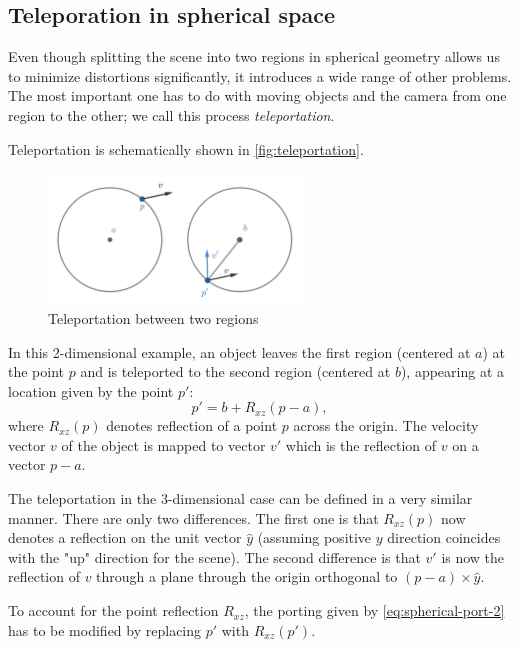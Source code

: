 \subsection{Teleporation in spherical space} \label{sub:teleportation}
Even though splitting the scene into two regions in spherical geometry allows us to minimize distortions significantly, it introduces a wide range of other problems.
The most important one has to do with moving objects and the camera from one region to the other; we call this process \textit{teleportation}.

Teleportation is schematically shown in \autoref{fig:teleportation}.
\begin{figure}[!htb]
    \centering
    \includegraphics[width=0.6\textwidth]{chapters/theoretical_foundations/sections/non-eudlidean-spaces/resources/teleportation.png}
    \caption{Teleportation between two regions}
    \label{fig:teleportation}
\end{figure}
In this 2-dimensional example, an object leaves the first region (centered at $a$) at the point $p$ and is teleported to the second region (centered at $b$), appearing at a location given by the point $p'$:
\begin{equation*}
    p' = b + R_{xz}(p - a),
\end{equation*}
where $R_{xz}(p)$ denotes reflection of a point $p$ across the origin.
The velocity vector $v$ of the object is mapped to vector $v'$ which is the reflection of $v$ on a vector $p - a$.

The teleportation in the 3-dimensional case can be defined in a very similar manner.
There are only two differences.
The first one is that $R_{xz}(p)$ now denotes a reflection on the unit vector $\hat{y}$ (assuming positive $y$ direction coincides with the "up" direction for the scene).
The second difference is that $v'$ is now the reflection of $v$ through a plane through the origin orthogonal to $(p - a) \times \hat{y}$.

To account for the point reflection $R_{xz}$, the porting given by \autoref{eq:spherical-port-2} has to be modified by replacing $p'$ with $R_{xz}(p')$.

